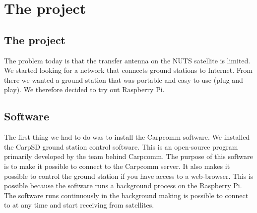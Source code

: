 \chapter{The project}
\label{chap:the_project}


\section {The project}

The problem today is that the transfer antenna on the NUTS satellite is limited. We started looking for a network that connects ground stations to Internet. From there we wanted a ground station that was portable and easy to use (plug and play). We therefore decided to try out Raspberry Pi.

\section {Software}

The first thing we had to do was to install the Carpcomm software. We installed the CarpSD ground station control software. This is an open-source program primarily developed by the team behind Carpcomm. The purpose of this software is to make it possible to connect to the Carpcomm server. It also makes it possible to control the ground station if you have access to a web-browser. This is possible because the software runs a background process on the Raspberry Pi. The software runs continuously in the background making is possible to connect to at any time and start receiving from satellites.

